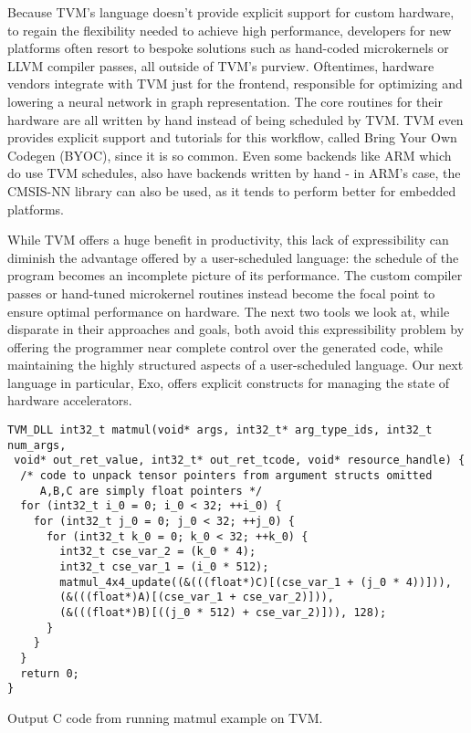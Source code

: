\documentclass[acmsmall, nonacm=true]{acmart}
\begin{document}
Because TVM's language doesn't provide explicit support for custom hardware, to regain the flexibility needed to achieve high performance, developers for new platforms often resort to bespoke solutions such as hand-coded microkernels or LLVM compiler passes, all outside of TVM's purview. Oftentimes, hardware vendors integrate with TVM just for the frontend, responsible for optimizing and lowering a neural network in graph representation. The core routines for their hardware are all written by hand instead of being scheduled by TVM. TVM even provides explicit support and tutorials for this workflow, called Bring Your Own Codegen (BYOC), since it is so common. Even some backends like ARM which do use TVM schedules, also have backends written by hand - in ARM's case, the CMSIS-NN library can also be used, as it tends to perform better for embedded platforms. 

While TVM offers a huge benefit in productivity, this lack of expressibility can diminish the advantage offered by a user-scheduled language: the schedule of the program becomes an incomplete picture of its performance. The custom compiler passes or hand-tuned microkernel routines instead become the focal point to ensure optimal performance on hardware. The next two tools we look at, while disparate in their approaches and goals, both avoid this expressibility problem by offering the programmer near complete control over the generated code, while maintaining the highly structured aspects of a user-scheduled language. Our next language in particular, Exo, offers explicit constructs for managing the state of hardware accelerators.



\begin{listing}
\centering
\begin{verbatim}
TVM_DLL int32_t matmul(void* args, int32_t* arg_type_ids, int32_t num_args,
 void* out_ret_value, int32_t* out_ret_tcode, void* resource_handle) {
  /* code to unpack tensor pointers from argument structs omitted
     A,B,C are simply float pointers */
  for (int32_t i_0 = 0; i_0 < 32; ++i_0) {
    for (int32_t j_0 = 0; j_0 < 32; ++j_0) {
      for (int32_t k_0 = 0; k_0 < 32; ++k_0) {
        int32_t cse_var_2 = (k_0 * 4);
        int32_t cse_var_1 = (i_0 * 512);
        matmul_4x4_update((&(((float*)C)[(cse_var_1 + (j_0 * 4))])),
        (&(((float*)A)[(cse_var_1 + cse_var_2)])),
        (&(((float*)B)[((j_0 * 512) + cse_var_2)])), 128);
      }
    }
  }
  return 0;
}
\end{verbatim}
\caption{Output C code from running matmul example on TVM.}
\label{lst:tvm_output}
\end{listing}
\end{document}
